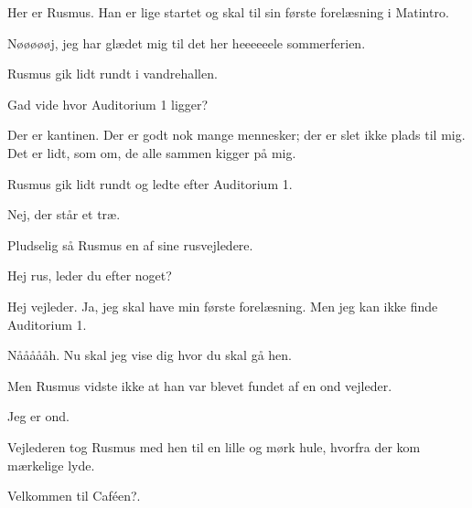 \documentclass[a4paper,11pt]{article}
\begin{document}
\begin{sketch}
 Her er Rusmus. Han er lige startet og skal til sin første forelæsning i Matintro.

 Nøøøøøj, jeg har glædet mig til det her heeeeeele sommerferien.

 Rusmus gik lidt rundt i vandrehallen.

 Gad vide hvor Auditorium 1 ligger?


 Der er kantinen. Der er godt nok mange mennesker; der er slet ikke plads til mig. Det er lidt, som om, de alle sammen kigger på mig.


 Rusmus gik lidt rundt og ledte efter Auditorium 1.


 Nej, der står et træ.


 Pludselig så Rusmus en af sine rusvejledere.


 Hej rus, leder du efter noget?

 Hej vejleder. Ja, jeg skal have min første forelæsning. Men jeg kan ikke finde Auditorium 1.

 Nåååååh. Nu skal jeg vise dig hvor du skal gå hen.


 Men Rusmus vidste ikke at han var blevet fundet af en ond vejleder.


 Jeg er ond.

 Vejlederen tog Rusmus med hen til en lille og mørk hule, hvorfra der kom mærkelige lyde.


 Velkommen til Caféen?.



\end{sketch}
\end{document}
